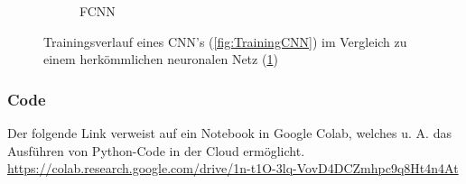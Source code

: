 \documentclass[12pt,a4]{article}
\begin{document}
\begin{figure}[!h]
\begin{subfigure}{.49\textwidth}
\caption{FCNN}
\label{fig:TrainingFCNN}
\end{subfigure}
\caption{Trainingsverlauf eines CNN's (\ref{fig:TrainingCNN}) im Vergleich zu einem herkömmlichen neuronalen Netz (\ref{fig:TrainingFCNN})}
\label{fig:TrainingComparison}
\end{figure}

\subsubsection*{Code}
Der folgende Link verweist auf ein Notebook in Google Colab, welches u. A. das Ausführen von Python-Code in der Cloud ermöglicht.\\[5pt]
\footnotesize\url{https://colab.research.google.com/drive/1n-t1O-3lq-VovD4DCZmhpc9q8Ht4n4At}\\[5pt]



\clearpage
\printindex
\end{document}
